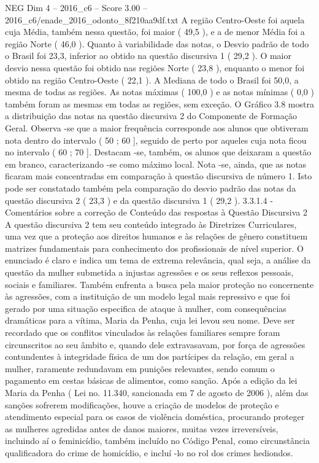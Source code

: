\begin{textsample}{NEG Dim 4 – 2016\_c6 – Score 3.00 – 2016\_c6/enade\_2016\_odonto\_8f210aa9df.txt}
A região Centro-Oeste foi aquela cuja Média, também nessa questão, foi maior ( 49,5 ), e a de menor Média foi a região Norte ( 46,0 ).
Quanto à variabilidade das notas, o Desvio padrão de todo o Brasil foi 23,3, inferior ao obtido na questão discursiva 1 ( 29,2 ).
O maior desvio nessa questão foi obtido nas regiões Norte ( 23,8 ), enquanto o menor foi obtido na região Centro-Oeste ( 22,1 ).
A Mediana de todo o Brasil foi 50,0, a mesma de todas as regiões.
As notas máximas ( 100,0 ) e as notas mínimas ( 0,0 ) também foram as mesmas em todas as regiões, sem exceção.
O Gráfico 3.8 mostra a distribuição das notas na questão discursiva 2 do Componente de Formação Geral.
Observa -se que a maior frequência corresponde aos alunos que obtiveram nota dentro do intervalo ( 50 ; 60 ], seguido de perto por aqueles cuja nota ficou no intervalo ( 60 ; 70 ].
Destacam -se, também, os alunos que deixaram a questão em branco, caracterizando -se como máximo local.
Nota -se, ainda, que as notas ficaram mais concentradas em comparação à questão discursiva de número 1.
Isto pode ser constatado também pela comparação do desvio padrão das notas da questão discursiva 2 ( 23,3 ) e da questão discursiva 1 ( 29,2 ). 3.3.1.4 - Comentários sobre a correção de Conteúdo das respostas à Questão Discursiva 2 A questão discursiva 2 tem seu conteúdo integrado às Diretrizes Curriculares, uma vez que a proteção aos direitos humanos e às relações de gênero constituem matrizes fundamentais para conhecimento dos profissionais de nível superior.
O enunciado é claro e indica um tema de extrema relevância, qual seja, a análise da questão da mulher submetida a injustas agressões e os seus reflexos pessoais, sociais e familiares.
Também enfrenta a busca pela maior proteção no concernente às agressões, com a instituição de um modelo legal mais repressivo e que foi gerado por uma situação especifica de ataque à mulher, com consequências dramáticas para a vítima, Maria da Penha, cuja lei levou seu nome.
Deve ser recordado que os conflitos vinculados às relações familiares sempre foram circunscritos ao seu âmbito e, quando dele extravasavam, por força de agressões contundentes à integridade física de um dos partícipes da relação, em geral a mulher, raramente redundavam em punições relevantes, sendo comum o pagamento em cestas básicas de alimentos, como sanção.
Após a edição da lei Maria da Penha ( Lei no. 11.340, sancionada em 7 de agosto de 2006 ), além das sanções sofrerem modificações, houve a criação de modelos de proteção e atendimento especial para os casos de violência doméstica, procurando proteger as mulheres agredidas antes de danos maiores, muitas vezes irreversíveis, incluindo aí o feminicídio, também incluído no Código Penal, como circunstância qualificadora do crime de homicídio, e incluí -lo no rol dos crimes hediondos.

\end{textsample}

